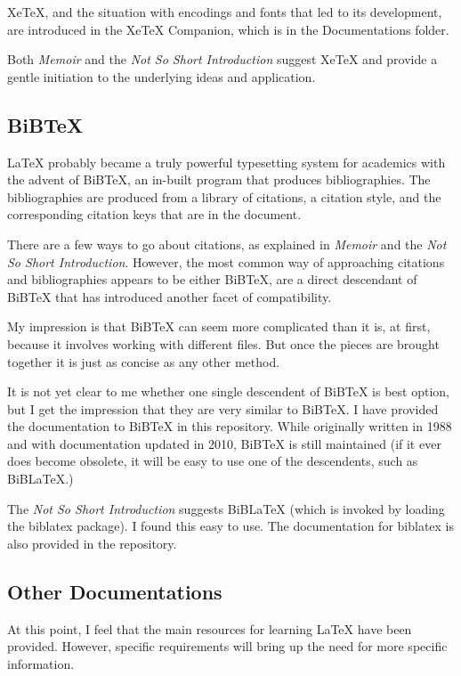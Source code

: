 \documentclass[11pt, oneside]{memoir}
\begin{document}
XeTeX, and the situation with encodings and fonts that led to its development, are introduced in the XeTeX Companion, which is in the Documentations folder.

Both \emph{Memoir} and the \emph{Not So Short Introduction} suggest XeTeX and provide a gentle initiation to the underlying ideas and application.

\subsection{BiBTeX}

LaTeX probably became a truly powerful typesetting system for academics with the advent of BiBTeX, an in-built program that produces bibliographies. The bibliographies are produced from a library of citations, a citation style, and the corresponding citation keys that are in the document.

There are a few ways to go about citations, as explained in \emph{Memoir} and the \emph{Not So Short Introduction}. However, the most common way of approaching citations and bibliographies appears to be either BiBTeX, are a direct descendant of BiBTeX that has introduced another facet of compatibility.

My impression is that BiBTeX can seem more complicated than it is, at first, because it involves working with different files. But once the pieces are brought together it is just as concise as any other method.

It is not yet clear to me whether one single descendent of BiBTeX is best option, but I get the impression that they are very similar to BiBTeX. I have provided the documentation to BiBTeX in this repository. While originally written in 1988 and with documentation updated in 2010, BiBTeX is still maintained (if it ever does become obsolete, it will be easy to use one of the descendents, such as BiBLaTeX.)

The \emph{Not So Short Introduction} suggests BiBLaTeX (which is invoked by loading the biblatex package). I found this easy to use. The documentation for biblatex is also provided in the repository.

\subsection{Other Documentations}
At this point, I feel that the main resources for learning LaTeX have been provided. However, specific requirements will bring up the need for more specific information. 
\end{document}
